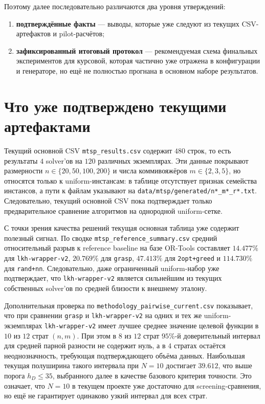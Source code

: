 \begin{refsection}
Поэтому далее последовательно различаются два уровня утверждений:
\begin{enumerate}[label=\arabic*.]
  \item \textbf{подтверждённые факты} --- выводы, которые уже следуют из текущих CSV-артефактов и pilot-расчётов;
  \item \textbf{зафиксированный итоговый протокол} --- рекомендуемая схема финальных экспериментов для курсовой, которая частично уже отражена в конфигурации и генераторе, но ещё не полностью прогнана в основном наборе результатов.
\end{enumerate}

\section{Что уже подтверждено текущими артефактами}

Текущий основной CSV \texttt{mtsp\_results.csv} содержит \(480\) строк, то есть результаты \(4\) solver'ов на \(120\) различных экземплярах. Эти данные покрывают размерности \(n \in \{20,50,100,200\}\) и числа коммивояжёров \(m \in \{2,3,5\}\), но относятся только к uniform-инстансам: в таблице отсутствует признак семейства инстансов, а пути к файлам указывают на \texttt{data/mtsp/generated/n*\_m*\_r*.txt}. Следовательно, текущий основной CSV пока подтверждает только предварительное сравнение алгоритмов на однородной uniform-сетке.

С точки зрения качества решений текущая основная таблица уже содержит полезный сигнал. По сводке \texttt{mtsp\_reference\_summary.csv} средний относительный разрыв к reference baseline на базе OR-Tools составляет \(14.477\%\) для \texttt{lkh-wrapper-v2}, \(20.769\%\) для \texttt{grasp}, \(47.413\%\) для \texttt{2opt+greed} и \(114.730\%\) для \texttt{rand+nn}. Следовательно, даже ограниченный uniform-набор уже подтверждает, что \texttt{lkh-wrapper-v2} является сильнейшим из текущих собственных solver'ов по средней близости к внешнему эталону.

Дополнительная проверка по \texttt{methodology\_pairwise\_current.csv} показывает, что при сравнении \texttt{grasp} и \texttt{lkh-wrapper-v2} на одних и тех же uniform-экземплярах \texttt{lkh-wrapper-v2} имеет лучшее среднее значение целевой функции в \(10\) из \(12\) страт \((n,m)\). При этом в \(8\) из \(12\) страт \(95\%\)-й доверительный интервал для средней парной разности не содержит нуль, а в \(4\) стратах остаётся неоднозначность, требующая подтверждающего объёма данных. Наибольшая текущая полуширина такого интервала при \(N=10\) достигает \(39.612\), что выше порога \(h_D \le 35\), выбранного далее в качестве базового критерия точности. Это означает, что \(N=10\) в текущем проекте уже достаточно для screening-сравнения, но ещё не гарантирует одинаково узкий интервал для всех страт.


\end{refsection}

